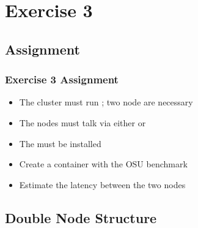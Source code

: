 \documentclass[xcolor=table,fontsize=10pt]{beamer}
\begin{document}
\section{Exercise 3}

\subsection{Assignment}

\begin{frame}
	\frametitle{Exercise 3 Assignment}


	\begin{itemize}

		\item The cluster must run 
			\hspace{-0.4cm}
			; two node are
			necessary
		\item The nodes must talk via either  or 
			\faNetworkWired
		\item The  must be installed 
		\item Create a container with the OSU benchmark	
		\item Estimate the latency between the two nodes 
	\end{itemize}

\end{frame}
\subsection{Double Node Structure}
\end{document}
